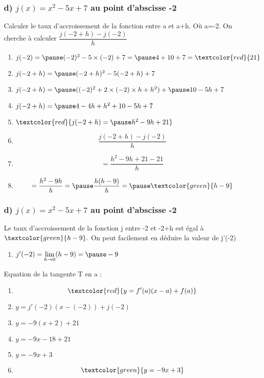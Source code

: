 \documentclass[t]{beamer}
\begin{document}
	\begin{frame}
		\frametitle{d) $j(x) = x^2 - 5x +7$ au point d'abscisse -2}
		\pause
		Calculer le taux d'accroissement de la fonction entre a et a+h. \pause Où a=-2.
		\pause
		On cherche à calculer \( \dfrac{j(-2+h) - j(-2)}{h} \)
		\pause
		\begin{enumerate}[]
			\item \(j(-2)= \pause (-2)^2 - 5\times (-2) + 7 = \pause 4 + 10 + 7 = \textcolor{red}{21} \)
			\pause
			\item \(j(-2+h)= \pause(-2+h)^2 - 5(-2+h) + 7 \)
			\pause
			\item \(j(-2+h)= \pause ((-2)^2+ 2 \times (-2) \times h + h^2) + \pause 10 - 5h + 7 \)
			\pause
			\item \(j(-2+h)= \pause 4 - 4h + h^2 + 10 - 5h + 7 \)
			\pause
			\item \(\textcolor{red}{j(-2+h)= \pause h^2 -9h + 21} \)
			\pause
			\item \[\dfrac{j(-2+h)-j(-2)}{h}\]
			\pause
			\item \[=\dfrac{h^2-9h+21-21}{h}\]
			\pause
			\item \[=\dfrac{h^2-9h}{h} = \pause \dfrac{h(h-9)}{h} = \pause \textcolor{green}{h-9} \]
			\pause
		\end{enumerate}
	\end{frame}

	\begin{frame}
		\frametitle{d) $j(x) = x^2 - 5x +7$ au point d'abscisse -2}
		\pause
		Le taux d'accroissement de la fonction j entre -2 et -2+h est égal à \pause $\textcolor{green}{h-9}.$ \pause On peut facilement en déduire la valeur de j'(-2)
		\pause
		\begin{enumerate}[]
			\item<+-> \(j'(-2) = \lim\limits_{h \rightarrow 0}(h-9) = \pause -9 \)
		\end{enumerate}
		\pause
		Equation de la tangente T en a :
		\pause
		\begin{enumerate}[]
			\item<+-> \[\textcolor{red}{y = f'(a)(x-a) + f(a)}\]
			\item<+-> \(y=j'(-2)(x-(-2)) + j(-2) \)
			\item<+-> \(y= -9(x+2) + 21\)
			\item<+-> \(y= -9x-18+21\)
			\item<+-> \(y= -9x+3 \)
			\pause
			\item<+-> \[\textcolor{green}{y = -9x+3 }\]
		\end{enumerate}
	\end{frame}
\end{document}
